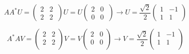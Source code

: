 \documentclass[a4paper,12pt]{article}
\begin{document}
\begin{equation}
AA^*U=\begin{pmatrix}
2&2	\\
2&2\
\end{pmatrix}  U =U \begin{pmatrix}
2&0	\\
0&0\
\end{pmatrix} \rightarrow U=\frac{\sqrt2}{2}\begin{pmatrix}
1&-1	\\
1&1\
\end{pmatrix} 
\end{equation}

\begin{equation}
A^*AV=\begin{pmatrix}
2&2	\\
2&2\\ 
\end{pmatrix}  V = V\begin{pmatrix}
2&0	\\
0&0\\ 
\end{pmatrix} \rightarrow  V=\frac{\sqrt2}{2}\begin{pmatrix}
1&-1	\\
1&1\\ 
\end{pmatrix}  
\end{equation}
\end{document}
